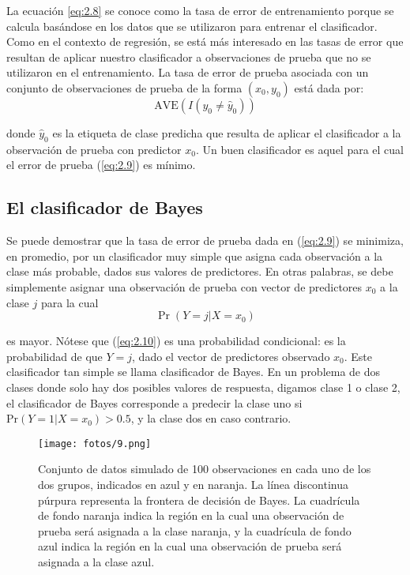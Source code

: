 La ecuación \ref{eq:2.8} se conoce como la tasa de error de entrenamiento porque se calcula basándose en los datos que se utilizaron para entrenar el clasificador. Como en el contexto de regresión, se está más interesado en las tasas de error que resultan de aplicar nuestro clasificador a observaciones de prueba que no se utilizaron en el entrenamiento. La tasa de error de prueba asociada con un conjunto de observaciones de prueba de la forma $(x_0,y_0)$ está dada por:
\begin{equation}
\text{AVE}(I(y_0 \neq \hat{y}_0))
\label{eq:2.9}
\end{equation}

donde $\hat{y}_0$ es la etiqueta de clase predicha que resulta de aplicar el clasificador a la observación de prueba con predictor $x_0$. Un buen clasificador es aquel para el cual el error de prueba (\ref{eq:2.9}) es mínimo. \\

\subsection{El clasificador de Bayes}

Se puede demostrar que la tasa de error de prueba dada en (\ref{eq:2.9}) se minimiza, en promedio, por un clasificador muy simple que asigna cada observación a la clase más probable, dados sus valores de predictores. En otras palabras, se debe simplemente asignar una observación de prueba con vector de predictores $x_0$ a la clase $j$ para la cual 
\begin{equation}
\Pr(Y = j | X = x_0)
\label{eq:2.10}
\end{equation}

es mayor. Nótese que (\ref{eq:2.10}) es una probabilidad condicional: es la probabilidad de que $Y = j$, dado el vector de predictores observado $x_0$. Este clasificador tan simple se llama clasificador de Bayes. En un problema de dos clases donde solo hay dos posibles valores de respuesta, digamos clase 1 o clase 2, el clasificador de Bayes corresponde a predecir la clase uno si $\text{Pr}(Y = 1 | X = x_0) > 0.5$, y la clase dos en caso contrario. \\

\begin{figure}[h]
\centering
\texttt{[image: fotos/9.png]}
\caption{Conjunto de datos simulado de 100 observaciones en cada uno de los dos grupos, indicados en azul y en naranja. La línea discontinua púrpura representa la frontera de decisión de Bayes. La cuadrícula de fondo naranja indica la región en la cual una observación de prueba será asignada a la clase naranja, y la cuadrícula de fondo azul indica la región en la cual una observación de prueba será asignada a la clase azul.}
\label{fig:2.13}
\end{figure}

